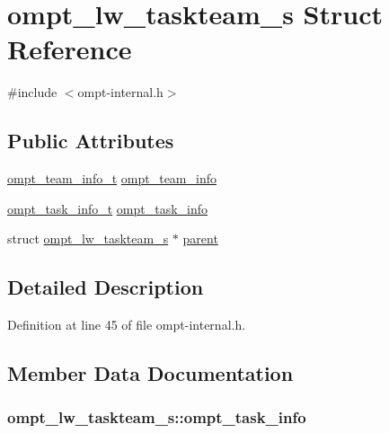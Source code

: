 \hypertarget{structompt__lw__taskteam__s}{\section{ompt\-\_\-lw\-\_\-taskteam\-\_\-s Struct Reference}
\label{structompt__lw__taskteam__s}
}


{\ttfamily \#include $<$ompt-\/internal.\-h$>$}

\subsection*{Public Attributes}
\begin{DoxyCompactItemize}
\item 
\hyperlink{structompt__team__info__t}{ompt\-\_\-team\-\_\-info\-\_\-t} \hyperlink{structompt__lw__taskteam__s_a548ab004e1bed7cea20532f1e168ce3d}{ompt\-\_\-team\-\_\-info}
\item 
\hyperlink{structompt__task__info__t}{ompt\-\_\-task\-\_\-info\-\_\-t} \hyperlink{structompt__lw__taskteam__s_aef7e0a0307d5b34644ddaa0cc7e9ba46}{ompt\-\_\-task\-\_\-info}
\item 
struct \hyperlink{structompt__lw__taskteam__s}{ompt\-\_\-lw\-\_\-taskteam\-\_\-s} $\ast$ \hyperlink{structompt__lw__taskteam__s_ac945aa2df678ab63f63a5f23ea796974}{parent}
\end{DoxyCompactItemize}


\subsection{Detailed Description}


Definition at line 45 of file ompt-\/internal.\-h.



\subsection{Member Data Documentation}
\hypertarget{structompt__lw__taskteam__s_aef7e0a0307d5b34644ddaa0cc7e9ba46}{
\subsubsection[{ompt\-\_\-task\-\_\-info}]{ ompt\-\_\-lw\-\_\-taskteam\-\_\-s\-::ompt\-\_\-task\-\_\-info}}\label{structompt__lw__taskteam__s_aef7e0a0307d5b34644ddaa0cc7e9ba46}



